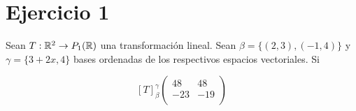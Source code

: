 \section*{Ejercicio 1}

Sean $T : \mathbb{R}^{2} \rightarrow P_{1}(\mathbb{R})$ una transformación lineal. Sean $\beta = \{ (2,3), (-1,4) \}$ y $\gamma = \{ 3 + 2x, 4\}$
bases ordenadas de los respectivos espacios vectoriales. Si

\begin{equation}
    \left[ T \right]_{\beta}^{\gamma}
     \begin{pmatrix}
        48 & 48 \\
       -23 & -19 \\
      \end{pmatrix}  
\end{equation}

